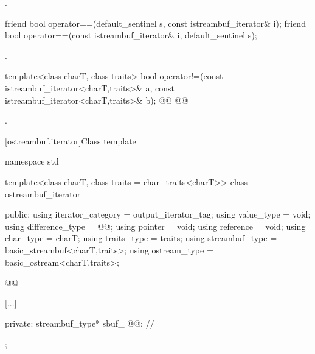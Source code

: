 \begin{itemdescr}
\pnum
\returns
{}.
\end{itemdescr}

\begin{addedblock}
%
\begin{itemdecl}
friend bool operator==(default_sentinel s, const istreambuf_iterator& i);
friend bool operator==(const istreambuf_iterator& i, default_sentinel s);
\end{itemdecl}

\begin{itemdescr}
\pnum
\returns {}.
\end{itemdescr}
\end{addedblock}

%
\begin{itemdecl}
template<class charT, class traits>
  bool operator!=(const istreambuf_iterator<charT,traits>& a,
                  const istreambuf_iterator<charT,traits>& b);
@@
@@
\end{itemdecl}

\begin{itemdescr}
\pnum
\returns
{}.
\end{itemdescr}


[ostreambuf.iterator]{Class template }

%
\begin{codeblock}
namespace std {
  template<class charT, class traits = char_traits<charT>>
  class ostreambuf_iterator {
  public:
    using iterator_category = output_iterator_tag;
    using value_type        = void;
    using difference_type   = @@;
    using pointer           = void;
    using reference         = void;
    using char_type         = charT;
    using traits_type       = traits;
    using streambuf_type    = basic_streambuf<charT,traits>;
    using ostream_type      = basic_ostream<charT,traits>;

    @@

    [...]

  private:
    streambuf_type* sbuf_ @@;    // \expos
  };
}
\end{codeblock}
